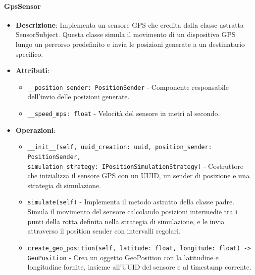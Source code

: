 \documentclass[10pt]{article}
\begin{document}
    \paragraph{GpsSensor}
    \begin{itemize} 
    \item \textbf{Descrizione}: Implementa un sensore GPS che eredita dalla classe astratta SensorSubject. Questa classe simula il movimento di un dispositivo GPS lungo un percorso predefinito e invia le posizioni generate a un destinatario specifico.
    \item \textbf{Attributi}:
    \begin{itemize}
        \item \texttt{\_\_position\_sender: PositionSender} - Componente responsabile dell'invio delle posizioni generate.
        \item \texttt{\_\_speed\_mps: float} - Velocità del sensore in metri al secondo.
    \end{itemize}
    
    \item \textbf{Operazioni}:
    \begin{itemize}
        \item \texttt{\_\_init\_\_(self, uuid\_creation: uuid, position\_sender: PositionSender, \\ simulation\_strategy: IPositionSimulationStrategy)} - Costruttore che inizializza il sensore GPS con un UUID, un sender di posizione e una strategia di simulazione.
        
        \item \texttt{simulate(self)} - Implementa il metodo astratto della classe padre. Simula il movimento del sensore calcolando posizioni intermedie tra i punti della rotta definita nella strategia di simulazione, e le invia attraverso il position sender con intervalli regolari.
        
        \item \texttt{create\_geo\_position(self, latitude: float, longitude: float) -> GeoPosition} - Crea un oggetto GeoPosition con la latitudine e longitudine fornite, insieme all'UUID del sensore e al timestamp corrente.
    \end{itemize}
    \end{itemize}
\end{document}
